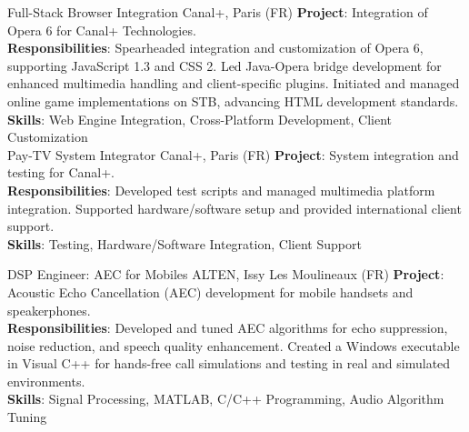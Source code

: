 \documentclass[
  a4paper,
   maincolor=cvblue,
   sectioncolor=cvblue,
]{fortysecondscv}
\begin{document}
\begin{cvtable}
    {Full-Stack Browser Integration}
    {Canal+,  Paris (FR)}
    {
      \textbf{Project}: Integration of Opera 6 for Canal+ Technologies.\\
      \textbf{Responsibilities}:
          Spearheaded integration and customization of Opera 6, supporting JavaScript 1.3 and CSS 2.
          Led Java-Opera bridge development for enhanced multimedia handling and client-specific plugins.
          Initiated and managed online game implementations on STB, advancing HTML development standards.\\
      \textbf{Skills}: Web Engine Integration, Cross-Platform Development, Client Customization\\
    }
    {Pay-TV System Integrator}
    {Canal+,  Paris (FR)}
    {
      \textbf{Project}: System integration and testing for Canal+.\\
      \textbf{Responsibilities}:
          Developed test scripts and managed multimedia platform integration.
          Supported hardware/software setup and provided international client support.\\
      \textbf{Skills}: Testing, Hardware/Software Integration, Client Support
    }

    {DSP Engineer: AEC for Mobiles}
    {ALTEN, Issy Les Moulineaux (FR)}
    {
      \textbf{Project}: Acoustic Echo Cancellation (AEC) development for mobile handsets and speakerphones.\\
      \textbf{Responsibilities}:
          Developed and tuned AEC algorithms for echo suppression, noise reduction, and speech quality enhancement.
          Created a Windows executable in Visual C++ for hands-free call simulations and testing in real and simulated environments.\\
      \textbf{Skills}: Signal Processing, MATLAB, C/C++ Programming, Audio Algorithm Tuning
    }


\end{cvtable}
\end{document}
